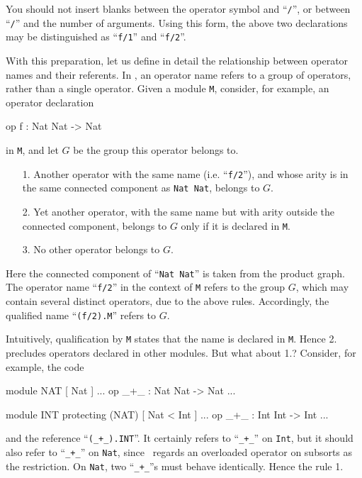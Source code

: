 \documentclass[a4paper]{memoir}
\begin{document}
You should not insert blanks between the operator symbol and ``\verb|/|'', or
between ``\verb|/|'' and the number of arguments. Using this form,
the above two declarations may be distinguished as
``\verb|f/1|'' and ``\verb|f/2|''.

With this preparation, let us define in detail the relationship between
operator names and their referents. In \cafeobj, an operator name
refers to a group of operators, rather than a single operator.
Given a module \verb|M|, consider, for example, an operator declaration
\begin{vvtm}
\begin{ccode}
  op f : Nat Nat -> Nat
\end{ccode}
\end{vvtm}
in \verb|M|, and let $G$ be the group this operator belongs to.
\begin{enumerate}
\item[1.] Another operator with the same name (i.e. ``\verb|f/2|''), and whose
arity is in the same connected component as \verb|Nat Nat|, belongs to
$G$.
\item[2.]  Yet another operator, with the same name but with arity outside
the connected component, belongs to $G$ only if it is declared in \verb|M|.
\item[3.] No other operator belongs to $G$.
\end{enumerate}
Here the connected component of ``\verb|Nat Nat|'' is taken from
the product graph.
The operator name ``\verb|f/2|'' in the context of \verb|M| refers to
the group $G$, which may contain several distinct operators, due to the
above rules. Accordingly, the qualified name ``\verb|(f/2).M|'' refers to
$G$.

Intuitively, qualification by \verb|M| states that the name is declared
in \verb|M|. Hence 2. precludes operators declared in other modules.
But what about 1.? Consider, for example, the code
\begin{vvtm}
\begin{ccode}
   module NAT {
     [ Nat ]
     ...
     op _+_ : Nat Nat -> Nat
     ...
   }

   module INT {
     protecting (NAT)
     [ Nat < Int ]
     ...
     op _+_ : Int Int -> Int
     ...
   }
\end{ccode}
\end{vvtm}
and the reference ``\verb|(_+_).INT|''. It certainly refers to ``\verb|_+_|''
on \verb|Int|, but it should also refer to ``\verb|_+_|'' on \verb|Nat|, since
\cafeobj~regards an overloaded operator on subsorts as the restriction.
On \verb|Nat|, two ``\verb|_+_|''s must behave identically. Hence the
rule 1.
\end{document}
